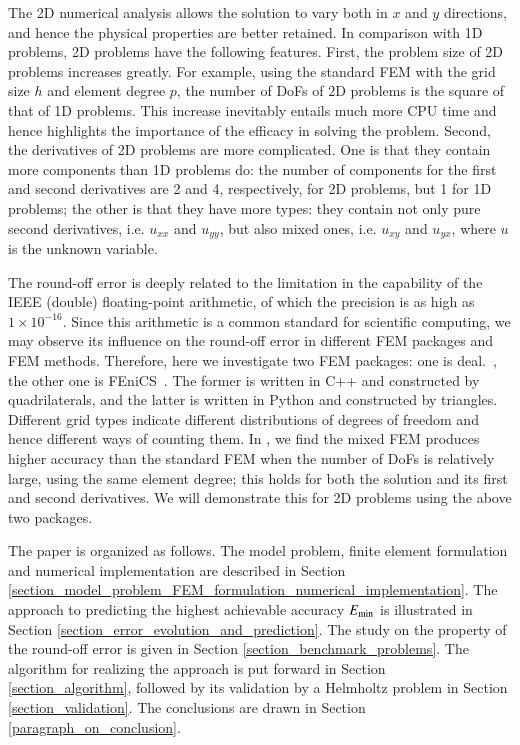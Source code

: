 \documentclass[review,3p]{elsarticle}
\begin{document}
The 2D numerical analysis allows the solution to vary both in $x$ and $y$ directions, and hence the physical properties are better retained. In comparison with 1D problems, 2D problems have the following features. 
First, the problem size of 2D problems increases greatly. For example, using the standard FEM with the grid size $h$ and element degree $p$, the number of DoFs of 2D problems is the square of that of 1D problems. This increase inevitably entails much more CPU time and hence highlights the importance of the efficacy in solving the problem. Second, the derivatives of 2D problems are more complicated. One is that they contain more components than 1D problems do: the number of components for the first and second derivatives are 2 and 4, respectively, for 2D problems, but 1 for 1D problems; the other is that they have more types: they contain not only pure second derivatives, i.e. $u_{xx}$ and $u_{yy}$, but also mixed ones, i.e. $u_{xy}$ and $u_{yx}$, where $u$ is the unknown variable.

The round-off error is deeply related to the limitation in the capability of the IEEE (double) floating-point arithmetic, of which the precision is as high as $1 \times 10^{-16}$. Since this arithmetic is a common standard for scientific computing, we may observe its influence on the round-off error in different FEM packages and FEM methods. Therefore, here we investigate two FEM packages: one is deal.~\cite{bangerth2007deal}, the other one is FEniCS~\cite{alnaes2015fenics}. The former is written in C++ and constructed by quadrilaterals, and the latter is written in Python and constructed by triangles. Different grid types indicate different distributions of degrees of freedom and hence different ways of counting them.
In \cite{liu386balancing}, we find the mixed FEM produces higher accuracy than the standard FEM when the number of DoFs is relatively large, using the same element degree; this holds for both the solution and its first and second derivatives. We will demonstrate this for 2D problems using the above two packages.

The paper is organized as follows. The model problem, finite element formulation and numerical implementation are described in Section \ref{section_model_problem_FEM_formulation_numerical_implementation}. The approach to predicting the highest achievable accuracy ${E}_{\rm {min}}$ is illustrated in Section \ref{section_error_evolution_and_prediction}. The study on the property of the round-off error is given in Section \ref{section_benchmark_problems}. The algorithm for realizing the approach is put forward in Section \ref{section_algorithm}, followed by its validation by a Helmholtz problem in Section \ref{section_validation}. The conclusions are drawn in Section \ref{paragraph_on_conclusion}.
\end{document}
